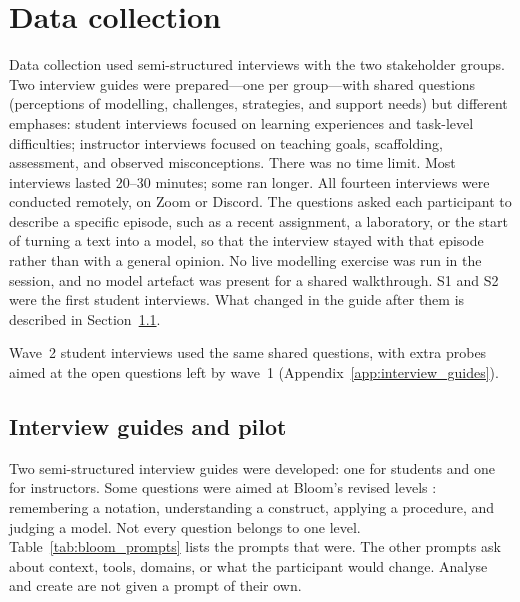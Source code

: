 \section{Data collection}
\label{sec:method_data_collection}

Data collection used semi-structured interviews with the two stakeholder groups. Two interview guides were prepared---one per group---with shared questions (perceptions of modelling, challenges, strategies, and support needs) but different emphases: student interviews focused on learning experiences and task-level difficulties; instructor interviews focused on teaching goals, scaffolding, assessment, and observed misconceptions. There was no time limit. Most interviews lasted 20--30 minutes; some ran longer. All fourteen interviews were conducted remotely, on Zoom or Discord. The questions asked each participant to describe a specific episode, such as a recent assignment, a laboratory, or the start of turning a text into a model, so that the interview stayed with that episode rather than with a general opinion. No live modelling exercise was run in the session, and no model artefact was present for a shared walkthrough. S1 and S2 were the first student interviews. What changed in the guide after them is described in Section~\ref{subsec:method_instruments_pilot}.

Wave~2 student interviews used the same shared questions, with extra probes aimed at the open questions left by wave~1 (Appendix~\ref{app:interview_guides}).

\subsection{Interview guides and pilot}
\label{subsec:method_instruments_pilot}

Two semi-structured interview guides were developed: one for students and one for instructors. Some questions were aimed at Bloom's revised levels \cite{krathwohl2002revision}: remembering a notation, understanding a construct, applying a procedure, and judging a model. Not every question belongs to one level. Table~\ref{tab:bloom_prompts} lists the prompts that were. The other prompts ask about context, tools, domains, or what the participant would change. Analyse and create are not given a prompt of their own.

